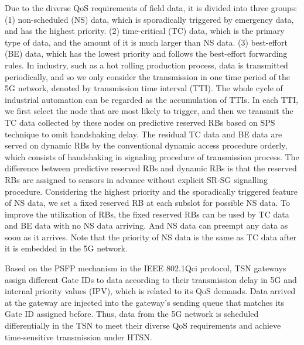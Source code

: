\documentclass{SCIS2021}
\begin{document}
	\par Due to the diverse QoS requirements of field data, it is divided into three groups: (1) non-scheduled (NS) data, which is sporadically triggered by emergency data, and has the highest priority. (2) time-critical (TC) data, which is the primary type of data, and the amount of it is much larger than NS data. (3) best-effort (BE) data, which has the lowest priority and follows the best-effort forwarding rules. In industry, such as a hot rolling production process, data is transmitted periodically, and so we only consider the transmission in one time period of the 5G network, denoted by transmission time interval (TTI). The whole cycle of industrial automation can be regarded as the accumulation of TTIs. {\color{blue}In each TTI, we first select the node that are most likely to trigger, and then we transmit the TC data collected by these nodes on predictive reserved RBs based on SPS technique to omit handshaking delay. The residual TC data and BE data are served on dynamic RBs by the conventional dynamic access procedure orderly, which consists of handshaking in signaling procedure of transmission process. The difference between predictive reserved RBs and dynamic RBs is that the reserved RBs are assigned to sensors in advance without explicit SR-SG signalling procedure.} Considering the highest priority and the sporadically triggered feature of NS data, we set a fixed reserved RB at each subslot for possible NS data. To improve the utilization of RBs, the fixed reserved RBs can be used by TC data and BE data with no NS data arriving. And NS data can preempt any data as soon as it arrives. Note that the priority of NS data is the same as TC data after it is embedded in the 5G network.

	\par {\color{black}Based on the PSFP mechanism in the IEEE 802.1Qci protocol, TSN gateways assign different Gate IDs to data according to their transmission delay in 5G and internal priority values (IPV), which is related to its QoS demands. Data arrived at the gateway are injected into the gateway's sending queue that matches its Gate ID assigned before.
	Thus, data from the 5G network is scheduled differentially in the TSN to meet their diverse QoS requirements and achieve time-sensitive transmission under HTSN.}
\end{document}
